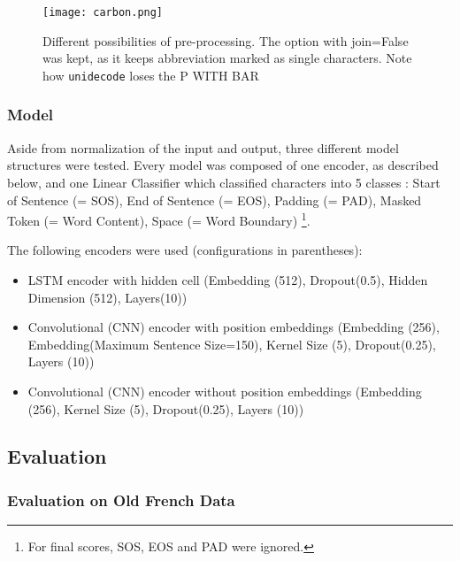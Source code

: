 \documentclass{jdmdh}
\begin{document}
\begin{figure}[!ht]
  \centering
  \texttt{[image: carbon.png]}
  \caption{Different possibilities of pre-processing. The option with join=False was kept, as it keeps abbreviation marked as single characters. Note how \texttt{unidecode} loses the P WITH BAR}
  \label{fig:normalization}
\end{figure}

\subsubsection{Model}

Aside from normalization of the input and output, three different model structures were tested. Every model was composed of one encoder, as described below, and one Linear Classifier which classified characters into 5 classes : Start of Sentence (= SOS), End of Sentence (= EOS), Padding (= PAD), Masked Token (= Word Content), Space (= Word Boundary) \footnote{For final scores, SOS, EOS and PAD were ignored.}.

The following encoders were used (configurations in parentheses):

\begin{itemize}
  \item LSTM encoder with hidden cell (Embedding (512), Dropout(0.5), Hidden Dimension (512), Layers(10))
  \item Convolutional (CNN) encoder with position embeddings (Embedding (256), Embedding(Maximum Sentence Size=150), Kernel Size (5), Dropout(0.25), Layers (10))
  \item Convolutional (CNN) encoder without position embeddings (Embedding (256), Kernel Size (5), Dropout(0.25), Layers (10))
\end{itemize}

\subsection{Evaluation}


\subsubsection{Evaluation on Old French Data}
\end{document}
